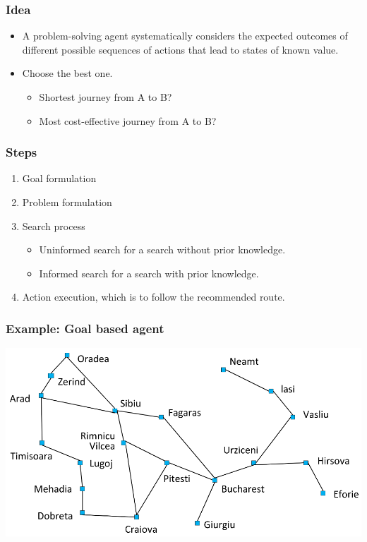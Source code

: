 \documentclass[11pt]{article}
\begin{document}
\subsubsection{Idea}
\label{sec:org6b81bd7}
\begin{itemize}
\item A problem-solving agent systematically considers the expected outcomes of different possible sequences of actions that lead to states of known value.
\item Choose the best one.
\begin{itemize}
\item Shortest journey from A to B?
\item Most cost-effective journey from A to B?
\end{itemize}
\end{itemize}
\subsubsection{Steps}
\label{sec:org80faf48}
\begin{enumerate}
\item Goal formulation
\item Problem formulation
\item Search process
\begin{itemize}
\item Uninformed search for a search without prior knowledge.
\item Informed search for a search with prior knowledge.
\end{itemize}
\item Action execution, which is to follow the recommended route.
\end{enumerate}
\subsubsection{Example: Goal based agent}
\label{sec:org66aa2e2}
\begin{center}
\includegraphics[width=.9\linewidth]{./images/romania-cities-diagram.png}
\end{center}
\end{document}
